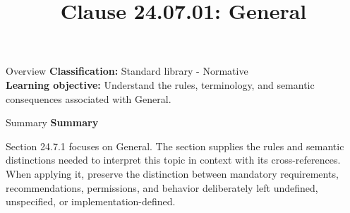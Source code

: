\documentclass[10pt,letterpaper]{article}
\title{Clause 24.07.01: General}
\author{}
\date{}
\begin{document}
\maketitle
\begin{CornellOverviewBox}{Overview}
\textbf{Classification:} Standard library - Normative\\[2pt]
\textbf{Learning objective:} Understand the rules, terminology, and semantic consequences associated with General.
\end{CornellOverviewBox}\begin{CornellSummaryBox}{Summary}
{\sffamily\bfseries\color{Accent} Summary}\par\vspace{3pt}Section 24.7.1 focuses on General. The section supplies the rules and semantic distinctions needed to interpret this topic in context with its cross-references. When applying it, preserve the distinction between mandatory requirements, recommendations, permissions, and behavior deliberately left undefined, unspecified, or implementation-defined.
\end{CornellSummaryBox}
\end{document}
